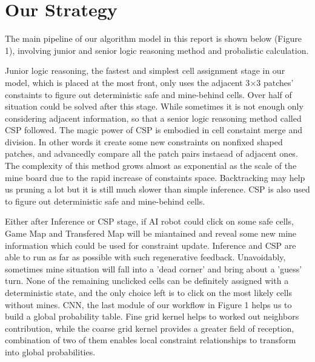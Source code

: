 \documentclass[10pt,twocolumn,letterpaper]{article}
\begin{document}
\section{Our Strategy}
The main pipeline of our algorithm model in this report is shown below (Figure 1), involving junior and senior logic reasoning method and probalistic calculation.
     \begin{figure}[H]
     \centering
     \label{workflow}
     \end{figure}
      
Junior logic reasoning, the fastest and simplest cell assignment stage in our model, which is placed at the most front, only uses the adjacent 3$\times$3 patches' constaints to figure out deterministic safe and mine-behind cells. Over half of situation could be solved after this stage. While sometimes it is not enough only considering adjacent information, so that a senior logic reasoning method called CSP followed. The magic power of CSP is embodied in cell constaint merge and division. In other words it create some new constraints on nonfixed shaped patches, and advancedly compare all the patch pairs instaead of adjacent ones. The complexity of this method grows almost as exponential as the scale of the mine board due to the rapid increase of constaints space. Backtracking may help us pruning a lot but it is still much slower than simple inference. CSP is also used to figure out deterministic safe and mine-behind cells.

Either after Inference or CSP stage, if AI robot could click on some safe cells, Game Map and Transfered Map will be miantained and reveal some new mine information which could be used for constraint update. Inference and CSP are able to run as far as possible with such regenerative feedback. Unavoidably, sometimes mine situation will fall into a 'dead corner' and bring about a 'guess' turn. None of the remaining unclicked cells can be definitely assigned with a deterministic state, and the only choice left is to click on the most likely cells without mines. CNN, the last module of our workflow in Figure 1 helps us to build a global probability table. Fine grid kernel helps to worked out neighbors contribution, while the coarse grid kernel provides a greater field of reception, combination of two of them enables local constraint relationships to transform into global probabilities.
\end{document}
